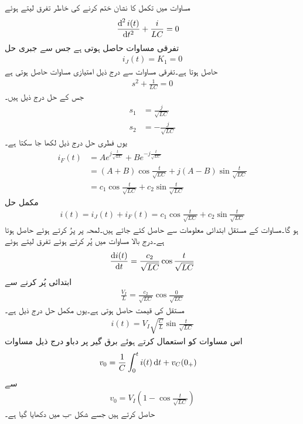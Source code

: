 مساوات  میں تکمل کا نشان ختم کرنے کی خاطر تفرق لیتے ہوئے
\begin{align*}
\frac{\dif^{\, 2} i(t)}{\dif t^2}+\frac{i}{LC}&=0
\end{align*}
تفرقی مساوات حاصل ہوتی ہے جس سے جبری حل
\begin{align*}
i_J(t)=K_1=0
\end{align*}
حاصل ہوتا ہے۔تفرقی مساوات سے درج ذیل امتیازی مساوات حاصل ہوتی ہے
\begin{align*}
s^2+\frac{1}{LC}=0
\end{align*}
جس کے حل درج ذیل ہیں۔
\begin{align*}
s_1&=\frac{j}{\sqrt{LC}}\\
s_2&=-\frac{j}{\sqrt{LC}}
\end{align*}
یوں فطری حل درج ذیل لکھا جا سکتا ہے۔
\begin{align*}
i_F(t)&=A e^{j\frac{t}{\sqrt{LC}}}+Be^{-j\frac{t}{\sqrt{LC}}}\\
&=(A+B) \cos \frac{t}{\sqrt{LC}}+j(A-B) \sin \frac{t}{\sqrt{LC}}\\
&=c_1\cos \frac{t}{\sqrt{LC}}+c_2\sin \frac{t}{\sqrt{LC}}
\end{align*}
مکمل حل
\begin{align*}
i(t)=i_J(t)+i_F(t)=c_1\cos \frac{t}{\sqrt{LC}}+c_2\sin \frac{t}{\sqrt{LC}}
\end{align*}
ہو گا۔مساوات کے مستقل ابتدائی معلومات سے حاصل کئے جاتے ہیں۔لمحہ  پر  پرُ کرتے ہوئے  حاصل ہوتا ہے۔درج بالا مساوات میں  پُر کرتے ہوئے تفرق لیتے ہوئے
\begin{align*}
\frac{\dif i(t)}{\dif t}=\frac{c_2}{\sqrt{LC}}\cos \frac{t}{\sqrt{LC}}
\end{align*}
ابتدائی  پُر کرنے سے
\begin{align*}
\frac{V_I}{L}=\frac{c_2}{\sqrt{LC}}\cos \frac{0}{\sqrt{LC}}
\end{align*}
مستقل کی قیمت  حاصل ہوتی ہے۔یوں مکمل حل درج ذیل ہے۔
\begin{align}\label{مساوات_عارضی_امالہ_برق_گیر_رو}
i(t)=V_I\sqrt{\frac{C}{L}} \sin \frac{t}{\sqrt{LC}}
\end{align}
اس مساوات کو استعمال کرتے ہوئے برق گیر پر دباو   درج ذیل مساوات
\begin{align*}
v_0&=\frac{1}{C}\int_{0}^{t} i(t) \dif t+v_C(0_+)
\end{align*}
سے
\begin{align}\label{مساوات_عارضی_امالہ_برق_گیر_دگنا_دباو}
v_0=V_I\left(1-\cos \frac{t}{\sqrt{LC}} \right)
\end{align}
حاصل کرتے ہیں جسے شکل -ب میں دکھایا گیا ہے۔

